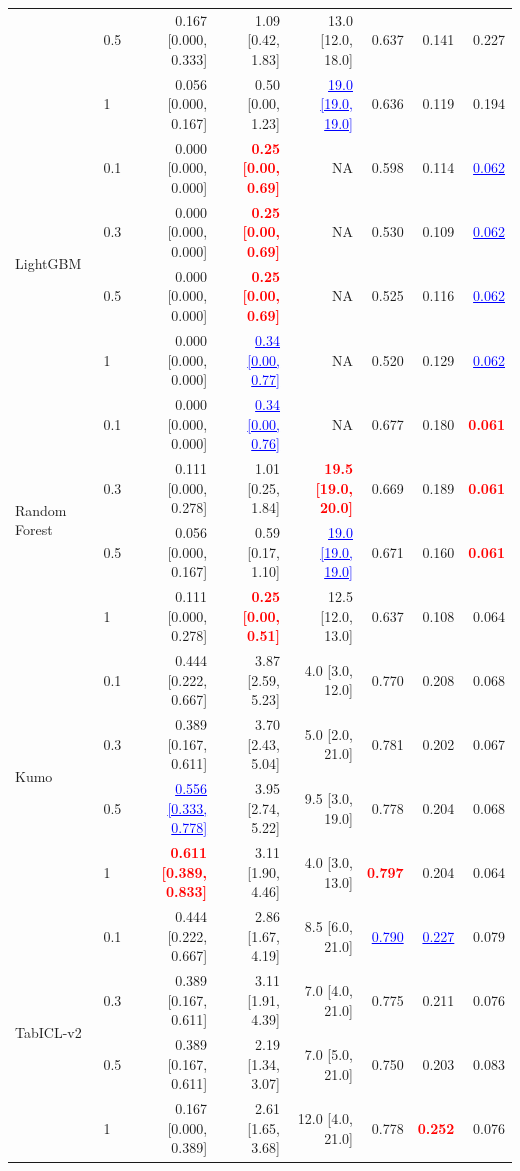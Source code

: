 \begin{table}[pos=!htbp,align=\centering]
{\begin{tabular}{llrrrrrr}
 & 0.5 & 0.167 [0.000, 0.333] & 1.09 [0.42, 1.83] & 13.0 [12.0, 18.0] & 0.637 & 0.141 & 0.227 \\
 & 1 & 0.056 [0.000, 0.167] & 0.50 [0.00, 1.23] & \textcolor{blue}{\underline{19.0 [19.0, 19.0]}} & 0.636 & 0.119 & 0.194 \\
\midrule
\multirow{4}{*}{LightGBM} & 0.1 & 0.000 [0.000, 0.000] & \textcolor{red}{\textbf{0.25 [0.00, 0.69]}} & NA & 0.598 & 0.114 & \textcolor{blue}{\underline{0.062}} \\
 & 0.3 & 0.000 [0.000, 0.000] & \textcolor{red}{\textbf{0.25 [0.00, 0.69]}} & NA & 0.530 & 0.109 & \textcolor{blue}{\underline{0.062}} \\
 & 0.5 & 0.000 [0.000, 0.000] & \textcolor{red}{\textbf{0.25 [0.00, 0.69]}} & NA & 0.525 & 0.116 & \textcolor{blue}{\underline{0.062}} \\
 & 1 & 0.000 [0.000, 0.000] & \textcolor{blue}{\underline{0.34 [0.00, 0.77]}} & NA & 0.520 & 0.129 & \textcolor{blue}{\underline{0.062}} \\
\midrule
\multirow{4}{*}{Random Forest} & 0.1 & 0.000 [0.000, 0.000] & \textcolor{blue}{\underline{0.34 [0.00, 0.76]}} & NA & 0.677 & 0.180 & \textcolor{red}{\textbf{0.061}} \\
 & 0.3 & 0.111 [0.000, 0.278] & 1.01 [0.25, 1.84] & \textcolor{red}{\textbf{19.5 [19.0, 20.0]}} & 0.669 & 0.189 & \textcolor{red}{\textbf{0.061}} \\
 & 0.5 & 0.056 [0.000, 0.167] & 0.59 [0.17, 1.10] & \textcolor{blue}{\underline{19.0 [19.0, 19.0]}} & 0.671 & 0.160 & \textcolor{red}{\textbf{0.061}} \\
 & 1 & 0.111 [0.000, 0.278] & \textcolor{red}{\textbf{0.25 [0.00, 0.51]}} & 12.5 [12.0, 13.0] & 0.637 & 0.108 & 0.064 \\
\midrule
\multirow{4}{*}{Kumo} & 0.1 & 0.444 [0.222, 0.667] & 3.87 [2.59, 5.23] & 4.0 [3.0, 12.0] & 0.770 & 0.208 & 0.068 \\
 & 0.3 & 0.389 [0.167, 0.611] & 3.70 [2.43, 5.04] & 5.0 [2.0, 21.0] & 0.781 & 0.202 & 0.067 \\
 & 0.5 & \textcolor{blue}{\underline{0.556 [0.333, 0.778]}} & 3.95 [2.74, 5.22] & 9.5 [3.0, 19.0] & 0.778 & 0.204 & 0.068 \\
 & 1 & \textcolor{red}{\textbf{0.611 [0.389, 0.833]}} & 3.11 [1.90, 4.46] & 4.0 [3.0, 13.0] & \textcolor{red}{\textbf{0.797}} & 0.204 & 0.064 \\
\midrule
\multirow{4}{*}{TabICL-v2} & 0.1 & 0.444 [0.222, 0.667] & 2.86 [1.67, 4.19] & 8.5 [6.0, 21.0] & \textcolor{blue}{\underline{0.790}} & \textcolor{blue}{\underline{0.227}} & 0.079 \\
 & 0.3 & 0.389 [0.167, 0.611] & 3.11 [1.91, 4.39] & 7.0 [4.0, 21.0] & 0.775 & 0.211 & 0.076 \\
 & 0.5 & 0.389 [0.167, 0.611] & 2.19 [1.34, 3.07] & 7.0 [5.0, 21.0] & 0.750 & 0.203 & 0.083 \\
 & 1 & 0.167 [0.000, 0.389] & 2.61 [1.65, 3.68] & 12.0 [4.0, 21.0] & 0.778 & \textcolor{red}{\textbf{0.252}} & 0.076 \\
\bottomrule
\end{tabular}
}
\end{table}

